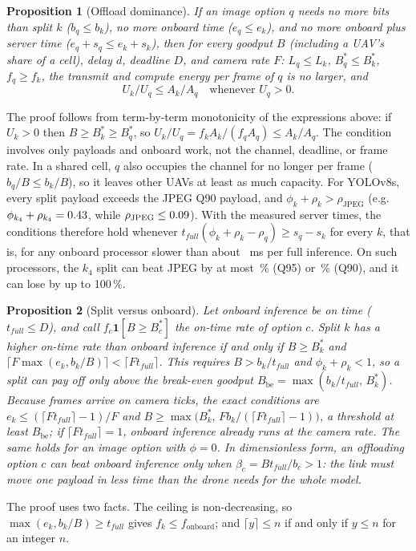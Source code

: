 \documentclass[journal,twocolumn,10pt]{IEEEtran}
\newtheorem{proposition}{Proposition}
\begin{document}
\begin{proposition}[Offload dominance]\label{prop:dominance}
If an image option $q$ needs no more bits than split $k$ ($b_q\le b_k$), no more onboard time ($e_q\le e_k$), and no more onboard plus server time ($e_q+s_q\le e_k+s_k$), then for every goodput $B$ (including a UAV's share of a cell), delay $d$, deadline $D$, and camera rate $F$: $L_q\le L_k$, $B^\ast_q\le B^\ast_k$, $f_q\ge f_k$, the transmit and compute energy per frame of $q$ is no larger, and
\[ U_k/U_q \le A_k/A_q \quad\text{whenever } U_q>0. \]
\end{proposition}
\noindent The proof follows from term-by-term monotonicity of the expressions above: if $U_k>0$ then $B\ge B^\ast_k\ge B^\ast_q$, so $U_k/U_q=f_kA_k/(f_qA_q)\le A_k/A_q$. The condition involves only payloads and onboard work, not the channel, deadline, or frame rate. In a shared cell, $q$ also occupies the channel for no longer per frame ($b_q/B\le b_k/B$), so it leaves other UAVs at least as much capacity. For YOLOv8s, every split payload exceeds the JPEG Q90 payload, and $\phi_k+\rho_k>\rho_{\mathrm{JPEG}}$ (e.g.\ $\phi_{k_4}+\rho_{k_4}=0.43$, while $\rho_{\mathrm{JPEG}}\le0.09$). With the measured server times, the conditions therefore hold whenever $t_{full}(\phi_k+\rho_k-\rho_q)\ge s_q-s_k$ for every $k$, that is, for any onboard processor slower than about \GenDominanceTmin~ms per full inference. On such processors, the $k_4$ split can beat JPEG by at most \GenAccBoundNinetyFivePct\,\% (Q95) or \GenAccBoundNinetyPct\,\% (Q90), and it can lose by up to 100\,\%.

\begin{proposition}[Split versus onboard]\label{prop:breakeven}
Let onboard inference be on time ($t_{full}\le D$), and call $f_c\mathbf{1}[B\ge B^\ast_c]$ the on-time rate of option $c$. Split $k$ has a higher on-time rate than onboard inference if and only if $B\ge B^\ast_k$ and $\lceil F\max(e_k,b_k/B)\rceil<\lceil F t_{full}\rceil$. This requires $B>b_k/t_{full}$ and $\phi_k+\rho_k<1$, so a split can pay off only above the break-even goodput $B_{\mathrm{be}}=\max(b_k/t_{full},\,B^\ast_k)$. Because frames arrive on camera ticks, the exact conditions are $e_k\le(\lceil F t_{full}\rceil-1)/F$ and $B\ge\max\big(B^\ast_k,\,F b_k/(\lceil F t_{full}\rceil-1)\big)$, a threshold at least $B_{\mathrm{be}}$; if $\lceil F t_{full}\rceil=1$, onboard inference already runs at the camera rate. The same holds for an image option with $\phi=0$. In dimensionless form, an offloading option $c$ can beat onboard inference only when $\beta_c = B t_{full}/b_c>1$: the link must move one payload in less time than the drone needs for the whole model.
\end{proposition}
\noindent The proof uses two facts. The ceiling is non-decreasing, so $\max(e_k,b_k/B)\ge t_{full}$ gives $f_k\le f_{\mathrm{onboard}}$; and $\lceil y\rceil\le n$ if and only if $y\le n$ for an integer $n$.
\end{document}
